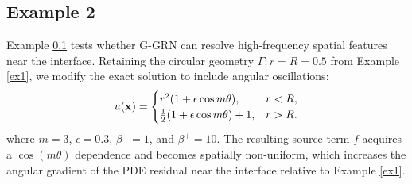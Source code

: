 \documentclass[11pt]{article}
\theoremstyle{definition}
\theoremstyle{remark}
\theoremstyle{plain}
\begin{document}
\begin{table}[htbp]
    \centering
    \caption{Performance of PINN for different values of $(\beta^-, \beta^+)$ at Layer 2.}
    \label{table2}
\end{table}

\subsection{Example 2} \label{ex2}

Example \ref{ex2} tests whether G-GRN can resolve high-frequency spatial features near the interface. Retaining the circular geometry $\Gamma:r = R = 0.5$ from Example \ref{ex1}, we modify the exact solution to include angular oscillations:
\begin{equation}
    u (\bf{x}) = \begin{cases}
        r^2(1 + \epsilon \cos m\theta), &r < R, \\
        \frac{1}{2} ( 1 + \epsilon \cos m\theta) + 1, &r > R.
    \end{cases}
\end{equation}
where $m = 3$, $\epsilon = 0.3$, $\beta^- = 1$, and $\beta^+ = 10$. The resulting source term $f$ acquires a $\cos (m \theta)$ dependence and becomes spatially non-uniform, which increases the angular gradient of the PDE residual near the interface relative to Example \ref{ex1}.
\end{document}
